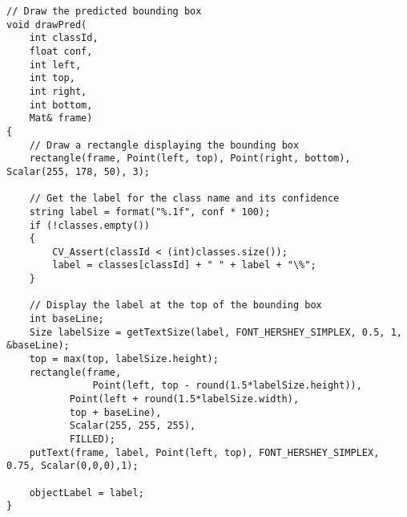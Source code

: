 \label{lst:drawPred}
\begin{verbatim}
// Draw the predicted bounding box
void drawPred(
	int classId,
	float conf,
	int left,
	int top,
	int right,
	int bottom,
	Mat& frame)
{
    // Draw a rectangle displaying the bounding box
    rectangle(frame, Point(left, top), Point(right, bottom), Scalar(255, 178, 50), 3);

    // Get the label for the class name and its confidence
    string label = format("%.1f", conf * 100);
    if (!classes.empty())
    {
        CV_Assert(classId < (int)classes.size());
        label = classes[classId] + " " + label + "\%";
    }

    // Display the label at the top of the bounding box
    int baseLine;
    Size labelSize = getTextSize(label, FONT_HERSHEY_SIMPLEX, 0.5, 1, &baseLine);
    top = max(top, labelSize.height);
    rectangle(frame,
    		   Point(left, top - round(1.5*labelSize.height)),
		   Point(left + round(1.5*labelSize.width),
		   top + baseLine),
		   Scalar(255, 255, 255),
		   FILLED);
    putText(frame, label, Point(left, top), FONT_HERSHEY_SIMPLEX, 0.75, Scalar(0,0,0),1);

    objectLabel = label;
}
\end{verbatim}

